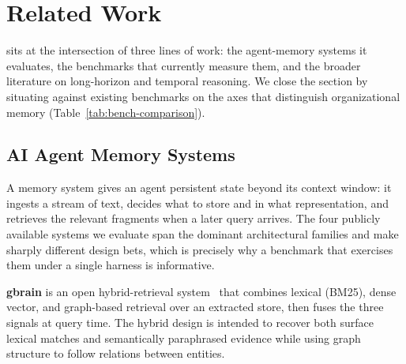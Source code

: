 \section{Related Work}
\label{sec:related}

\bench{} sits at the intersection of three lines of work: the agent-memory
systems it evaluates, the benchmarks that currently measure them, and the
broader literature on long-horizon and temporal reasoning. We close the section
by situating \bench{} against existing benchmarks on the axes that distinguish
organizational memory (Table~\ref{tab:bench-comparison}).

\subsection{AI Agent Memory Systems}
\label{sec:related:systems}

A memory system gives an agent persistent state beyond its context window: it
ingests a stream of text, decides what to store and in what representation, and
retrieves the relevant fragments when a later query arrives. The four publicly
available systems we evaluate span the dominant architectural families and make
sharply different design bets, which is precisely why a benchmark that exercises
them under a single harness is informative.

\textbf{gbrain} is an open hybrid-retrieval system~\citep{gbrain} that combines
lexical (BM25), dense vector, and graph-based retrieval over an extracted store,
then fuses the three signals at query time. The hybrid design is intended to
recover both surface lexical matches and semantically paraphrased evidence while
using graph structure to follow relations between entities.

